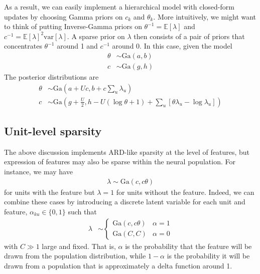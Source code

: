 \documentclass[11pt]{article}
\begin{document}
As a result, we can easily implement a hierarchical model with closed-form updates by choosing Gamma priors on $c_k$ and $\theta_k$. More intuitively, we might want to think of putting Inverse-Gamma priors on $\theta^{-1} = \mathbb{E}[\lambda]$ and $c^{-1} = \mathbb{E}[\lambda]^2 \mathrm{var}[\lambda]$. A sparse prior on $\lambda$ then consists of a pair of priors that concentrates $\theta^{-1}$ around 1 and $c^{-1}$ around 0. In this case, given the model
\begin{align}
    \theta &\sim \text{Ga}(a, b) \\
    c &\sim \text{Ga}(g, h)
\end{align}
The posterior distributions are
\begin{align}
    \theta &\sim \text{Ga}\left(a + Uc, b + c\sum_u \lambda_u \right) \\
    c &\sim \text{Ga}\left(g + \frac{U}{2}, h - U(\log \theta + 1)
    + \sum_u \left[ \theta \lambda_u - \log \lambda_u \right]\right)
\end{align}

\subsection{Unit-level sparsity}
The above discussion implements ARD-like sparsity at the level of features, but expression of features may also be sparse within the neural population. For instance, we may have
\begin{align}
    \lambda \sim \mathrm{Ga}(c, c\theta)
\end{align}
for units with the feature but $\lambda = 1$ for units without the feature. Indeed, we can combine these cases by introducing a discrete latent variable for each unit and feature, $\alpha_{ku} \in \lbrace 0, 1 \rbrace$ such that
\begin{align}
    \lambda &\sim
    \begin{cases}
        \mathrm{Ga}(c, c\theta) & \alpha = 1 \\
        \mathrm{Ga}(C, C) & \alpha = 0
    \end{cases}
\end{align}
with $C \gg 1$ large and fixed. That is, $\alpha$ is the probability that the feature will be drawn from the population distribution, while $1 - \alpha$ is the probability it will be drawn from a population that is approximately a delta function around 1.
\end{document}
